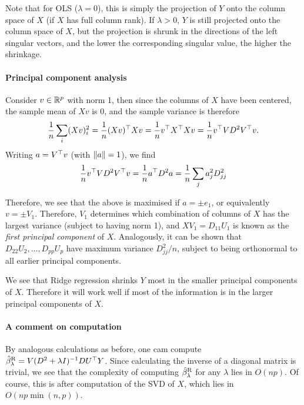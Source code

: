 Note that for OLS ($\lambda = 0$), this is simply the projection of $Y$ onto the column space of $X$ (if $X$ has full column rank). If $\lambda > 0$, $Y$ is still projected onto the column space of $X$, but the projection is shrunk in the directions of the left singular vectors, and the lower the corresponding singular value, the higher the shrinkage. 


\paragraph{Principal component analysis} Consider $v \in \mathbb R^p$ with norm 1, then since the columns of $X$ have been centered, the sample mean of $Xv$ is 0, and the sample variance is therefore
\[
\frac1n \sum_i (Xv)_i^2 = \frac1n (Xv)^\top Xv = \frac1n v^\top X^\top X v = \frac1n v^\top VD^2V^\top v. 
\]
Writing $a = V^\top v$ (with $\norm{a} = 1$), we find
\[
\frac1n v^\top VD^2 V^\top v = \frac1n a^\top D^2 a = \frac1n \sum_j a_j^2 D_{jj}^2
\]

Therefore, we see that the above is maximised if $a = \pm e_1$, or equivalently $v = \pm V_1$. Therefore, $V_1$ determines which combination of columns of $X$ has the largest variance (subject to having norm 1), and $XV_1 = D_{11} U_1$ is known as the \emph{first principal component} of $X$. Analogously, it can be shown that $D_{22} U_2, \dotsc, D_{pp} U_p$ have maximum variance $D_{jj}^2 / n$, subject to being orthonormal to all earlier principal components. 

We see that Ridge regression shrinks $Y$ most in the smaller principal components of $X$. Therefore it will work well if most of the information is in the larger principal components of $X$. 

\paragraph{A comment on computation}
By analogous calculations as before, one cam compute $\hat\beta_\lambda^\mathrm{R} = V(D^2 + \lambda I)^{-1} DU^\top Y$. Since calculating the inverse of a diagonal matrix is trivial, we see that the complexity of computing $\hat\beta_\lambda^\mathrm{R}$ for any $\lambda$ lies in $O(np)$. Of course, this is after computation of the SVD of $X$, which lies in $O(np \min(n, p))$. 

